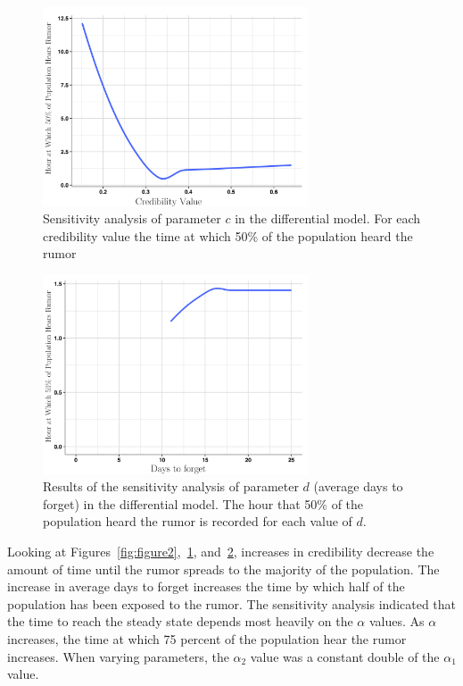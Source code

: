 \begin{figure}[H]
\captionsetup{width=0.8\textwidth}
\centering
    \includegraphics[width=0.7\textwidth]{figures/figure3}
  \caption{ Sensitivity analysis of parameter $ c $ in the differential model.
For each credibility value the time at which 50\% of the population heard the rumor }
\label{fig:figure3}
\end{figure}

\begin{figure}[H]
\captionsetup{width=0.8\textwidth}
\centering
    \includegraphics[width=0.7\textwidth]{figures/figure4}
  \caption{Results of the sensitivity analysis of parameter $ d $ (average days to forget) in the differential model.
The hour that 50\% of the population heard the rumor is recorded for each value of $ d $.}
\label{fig:figure4}
\end{figure}

Looking at Figures~\ref{fig:figure2},~\ref{fig:figure3}, and~\ref{fig:figure4}, increases in credibility decrease the amount of time until the rumor spreads to the majority of the population.
The increase in average days to forget increases the time by which half of the population has been exposed to the rumor.
The sensitivity analysis indicated that the time to reach the steady state depends most heavily on the $\alpha$ values.
As $ \alpha $ increases, the time at which 75 percent of the population hear the rumor increases.
When varying parameters, the $ \alpha_2 $ value was a constant double of the $ \alpha_1 $ value.

